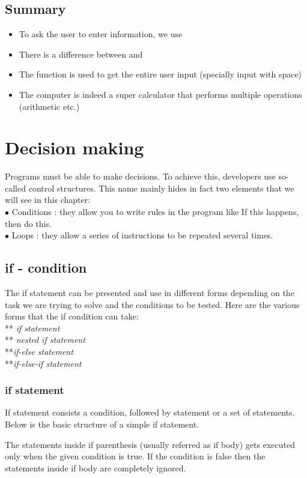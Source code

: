 \documentclass[11pt, a4paper]{article}
\begin{document}
\subsection{Summary}
\begin{itemize}
    \item To ask the user to enter information, we use 
    \item There is a difference between  and 
    \item The function  is used to get the entire user input (specially input with space)
    \item The computer is indeed a super calculator that performs multiple operations (arithmetic etc.)
\end{itemize}

\newpage
\section{Decision making}
Programs must be able to make decisions. To achieve this, developers use so-called control structures.
This name mainly hides in fact two elements that we will see in this chapter:\\
$\bullet$ Conditions : they allow you to write rules in the program like If this happens, then do this.\\
$\bullet$ Loops : they allow a series of instructions to be repeated several times.

\subsection{if - condition}
The if statement can be presented and use in different forms depending on the task we are trying to solve
and the conditions to be tested. Here are the various forms that the if condition can take:\\
** \textit{if statement}\\ ** \textit{nested if statement}\\ **\textit{if-else statement}\\
**\textit{if-else-if statement}

\subsubsection{if statement}
If statement consists a condition, followed by statement or a set of statements. Below is the basic structure
of a simple if statement.

The statements inside if parenthesis (usually referred as if body) gets executed only when
the given condition is true. If the condition is false then the statements inside if body
are completely ignored.

\end{document}
